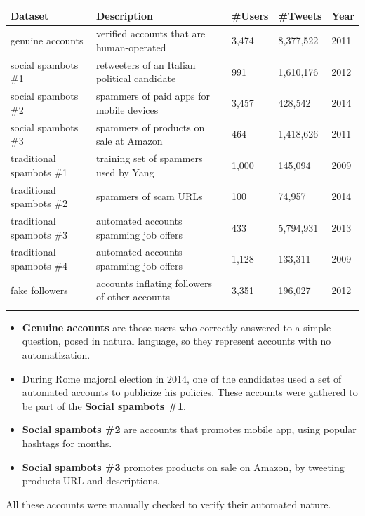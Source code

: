 \tiny
\begin{center}
\begin{tabular}{lllll}
	Dataset&Description&\#Users&\#Tweets&Year\\ \hline\hline
	genuine accounts&
	verified accounts that are human-operated&
	3,474&
	8,377,522
	&2011\\
	social spambots \#1&
	retweeters of an Italian political candidate&
	991&
	1,610,176&
	2012 \\
	social spambots \#2&
	spammers of paid apps for mobile devices&
	3,457&
	428,542&
	2014 \\
	social spambots \#3&
	spammers of products on sale at	Amazon&
	464&
	1,418,626&
	2011 \\
	traditional spambots \#1&
	training set of spammers used by Yang\cite{Yang}&
	1,000&
	145,094&
	2009 \\
	traditional spambots \#2&
	spammers of scam URLs&
	100&
	74,957&
	2014 \\
	traditional spambots \#3&
	automated accounts spamming job offers&
	433&
	5,794,931&
	2013 \\
	traditional spambots \#4&
	automated accounts spamming job offers&
	1,128&
	133,311&
	2009 \\
	fake followers&
	accounts inflating followers of other accounts&
	3,351&
	196,027&
	2012 \\ \hline\\
	
\end{tabular}
\end{center}

\normalsize
\begin{itemize}
	\item \textbf{Genuine accounts} are those users who correctly answered to a simple question, posed in natural language, so they represent accounts with no automatization.
	\item  During Rome majoral election in 2014, one of the candidates used a set of automated accounts to publicize his policies. These accounts were gathered to be part of the \textbf{Social spambots \#1}.
	\item \textbf{Social spambots \#2} are accounts that promotes mobile app, using popular hashtags for months.
	\item  \textbf{Social spambots \#3} promotes products on sale on Amazon, by tweeting products URL and descriptions.
\end{itemize}
All these accounts were manually checked to verify their automated nature.

